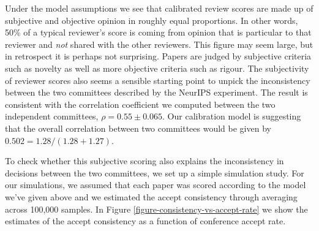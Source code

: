 \documentclass[twoside]{article}
\begin{document}
Under the model assumptions we see that calibrated review scores are made up of subjective and objective opinion in roughly equal proportions. In other words, 50\% of a typical reviewer's score is coming from opinion that is particular to that reviewer and \emph{not} shared with the other reviewers. This figure may seem large, but in retrospect it is perhaps not surprising. Papers are judged by subjective criteria such as novelty as well as more objective criteria such as rigour. The subjectivity of reviewer scores also seems a sensible starting point to unpick the inconsistency between the two committees described by the NeurIPS experiment. The result is consistent with the correlation coefficient we computed between the two independent committees, $\rho = 0.55 \pm 0.065$. Our calibration model is suggesting that the overall correlation between two committees would be given by $0.502 = 1.28/(1.28+1.27)$.

To check whether this subjective scoring also explains the inconsistency in decisions between the two committees, we set up a simple simulation study. For our simulations, we assumed that each paper was scored according to the model we've given above and we estimated the accept consistency through averaging across 100,000 samples. In Figure \ref{figure-consistency-vs-accept-rate} we show the estimates of the accept consistency as a function of conference accept rate.
\end{document}
